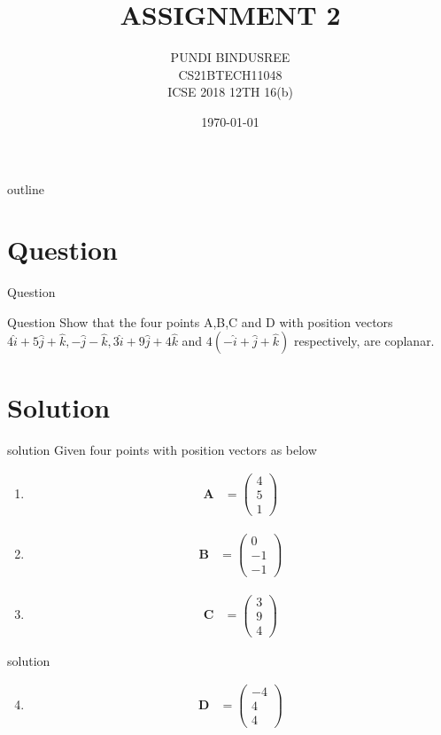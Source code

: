 \documentclass{beamer}
\title{ASSIGNMENT 2}
\author{PUNDI BINDUSREE \\ CS21BTECH11048 \\ICSE 2018 12TH 16(b)}
\date{\today}
\let\vec\mathbf
\newcommand{\myvec}[1]{\ensuremath{\begin{pmatrix}#1\end{pmatrix}}}
\begin{document}
\begin{frame}
\titlepage
\end{frame}

\logo{}
\begin{frame}{outline}
\tableofcontents
\end{frame}

\section{Question}
\begin{frame}{Question}
\begin{block}{Question}
Show that the four points A,B,C and D with position vectors $4\hat{i}+5\hat{j}+\hat{k},-\hat{j}-\hat{k},3\hat{i}+9\hat{j}+4\hat{k}$ and $4(-\hat{i}+\hat{j}+\hat{k})$ respectively, are coplanar.
\end{block}
\end{frame}


\section{Solution}
\begin{frame}{solution}
 Given four points with position vectors as below
\begin{enumerate}
     \item \begin{align}\vec{A} & =\myvec{4\\5\\1}\end{align}
     \item \begin{align}\vec{B} & =\myvec{0\\-1\\-1}\end{align}     
     \item \begin{align}\vec{C} & =\myvec{3\\9\\4}\end{align}
     \end{enumerate}
 \end{frame}
 
 
 \begin{frame}{solution}
 \begin{enumerate}
 \setcounter{enumi}{3}\item \begin{align}\vec{D} & =\myvec{-4\\4\\4}\end{align}
\end{enumerate}
\end{frame}
 
\end{document}
